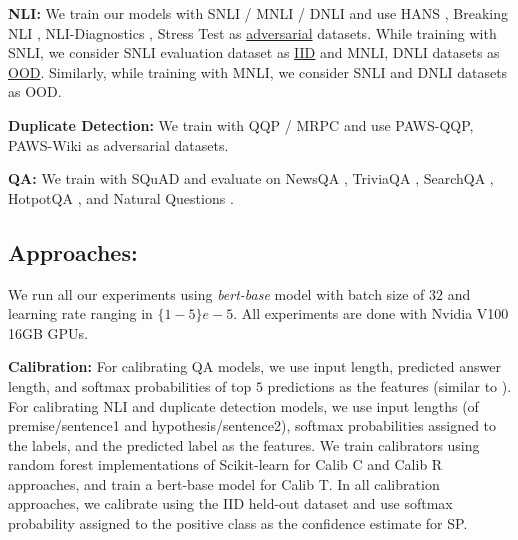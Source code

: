 \documentclass[11pt]{article}
\begin{document}
\textbf{NLI:} We train our models with SNLI \cite{bowman-etal-2015-large} / MNLI \cite{williams-etal-2018-broad} / DNLI \cite{welleck-etal-2019-dialogue} and use HANS \cite{mccoy-etal-2019-right}
, Breaking NLI \cite{glockner-etal-2018-breaking}, NLI-Diagnostics \cite{wang-etal-2018-glue}
, Stress Test \cite{naik2018stress}
as \underline{adversarial} datasets.
While training with SNLI, we consider SNLI evaluation dataset as \underline{IID} and MNLI, DNLI datasets as \underline{OOD}.
Similarly, while training with MNLI, we consider SNLI and DNLI datasets as OOD.

\textbf{Duplicate Detection:} We train with QQP \cite{iyer2017first} / MRPC \cite{dolan2005automatically} and use PAWS-QQP, PAWS-Wiki \cite{zhang-etal-2019-paws} as adversarial datasets.

\textbf{QA:} We train with SQuAD \cite{rajpurkar-etal-2016-squad} and evaluate on NewsQA \cite{trischler-etal-2017-newsqa}, TriviaQA \cite{joshi-etal-2017-triviaqa}, SearchQA \cite{dunn2017searchqa}, HotpotQA \cite{yang-etal-2018-hotpotqa}, and Natural
Questions \cite{kwiatkowski-etal-2019-natural}.

\subsection{Approaches:}
We run all our experiments using \textit{bert-base} model \cite{devlin-etal-2019-bert}
with batch size of $32$ and learning rate ranging in $\{1{-}5\}e{-}5$. 
All experiments are done with Nvidia V100 16GB GPUs.

\textbf{Calibration: }For calibrating QA models, we use input length, predicted answer length, and softmax probabilities of top $5$ predictions as the features (similar to \citet{kamath-etal-2020-selective}).
For calibrating NLI and duplicate detection models, we use input lengths (of premise/sentence1 and hypothesis/sentence2), softmax probabilities assigned to the labels, and the predicted label as the features.
We train calibrators using random forest implementations of Scikit-learn \cite{pedregosa2011scikit} for Calib C and Calib R approaches, and train a bert-base model for Calib T. 
In all calibration approaches, we calibrate using the IID held-out dataset and use softmax probability assigned to the positive class as the confidence estimate for SP.
\end{document}
